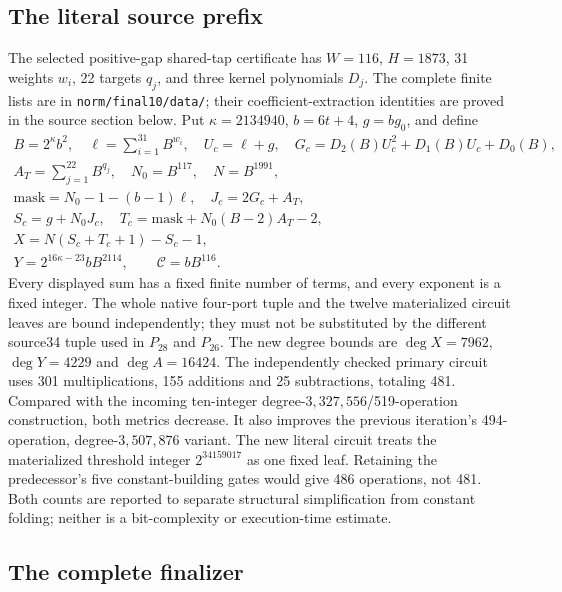\subsection{The literal source prefix}
The selected positive-gap shared-tap certificate has $W=116$, $H=1873$,
31 weights $w_i$, 22 targets $q_j$, and three kernel polynomials $D_j$.
The complete finite lists are in \texttt{norm/final10/data/}; their
coefficient-extraction identities are proved in the source section below.
Put $\kappa=2134940$, $b=6t+4$, $g=bg_0$, and define
\begin{gather*}
 B=2^\kappa b^2,\quad \ell=\sum_{i=1}^{31}B^{w_i},\quad
 U_c=\ell+g,\quad G_c=D_2(B)U_c^2+D_1(B)U_c+D_0(B),\\
 A_T=\sum_{j=1}^{22}B^{q_j},\quad N_0=B^{117},\quad N=B^{1991},\\
 \mathrm{mask}=N_0-1-(b-1)\ell,\quad J_c=2G_c+A_T,\\
 S_c=g+N_0J_c,\quad T_c=\mathrm{mask}+N_0(B-2)A_T-2,\\
 X=N(S_c+T_c+1)-S_c-1,\\
 Y=2^{16\kappa-23}bB^{2114},\qquad\mathcal C=bB^{116}.
\end{gather*}
Every displayed sum has a fixed finite number of terms, and every exponent
is a fixed integer. The whole native four-port tuple and the twelve
materialized circuit leaves are bound independently; they must not be
substituted by the different source34 tuple used in $P_{28}$ and $P_{26}$.
The new degree bounds are $\deg X=7962$, $\deg Y=4229$ and
$\deg A=16424$. The independently checked primary circuit uses 301
multiplications, 155 additions and 25 subtractions, totaling 481.
Compared with the incoming ten-integer degree-$3{,}327{,}556$/519-operation
construction, both metrics decrease. It also improves the previous
iteration's 494-operation, degree-$3{,}507{,}876$ variant.
The new literal circuit treats the materialized threshold integer
$2^{34159017}$ as one fixed leaf. Retaining the predecessor's five
constant-building gates would give 486 operations, not 481. Both counts
are reported to separate structural simplification from constant folding;
neither is a bit-complexity or execution-time estimate.

\subsection{The complete finalizer}

